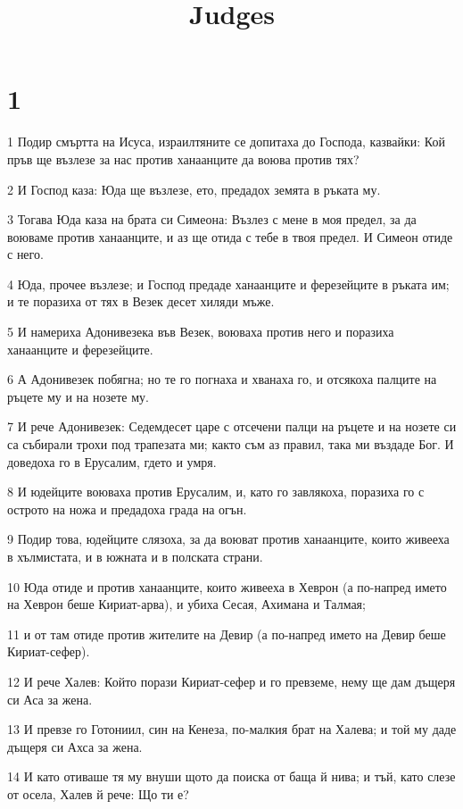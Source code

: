 

\title{Judges}


\chapter{1}

\par 1 Подир смъртта на Исуса, израилтяните се допитаха до Господа, казвайки: Кой пръв ще възлезе за нас против ханаанците да воюва против тях?
\par 2 И Господ каза: Юда ще възлезе, ето, предадох земята в ръката му.
\par 3 Тогава Юда каза на брата си Симеона: Възлез с мене в моя предел, за да воюваме против ханаанците, и аз ще отида с тебе в твоя предел. И Симеон отиде с него.
\par 4 Юда, прочее възлезе; и Господ предаде ханаанците и ферезейците в ръката им; и те поразиха от тях в Везек десет хиляди мъже.
\par 5 И намериха Адонивезека във Везек, воюваха против него и поразиха ханаанците и ферезейците.
\par 6 А Адонивезек побягна; но те го погнаха и хванаха го, и отсякоха палците на ръцете му и на нозете му.
\par 7 И рече Адонивезек: Седемдесет царе с отсечени палци на ръцете и на нозете си са събирали трохи под трапезата ми; както съм аз правил, така ми въздаде Бог. И доведоха го в Ерусалим, гдето и умря.
\par 8 И юдейците воюваха против Ерусалим, и, като го завлякоха, поразиха го с острото на ножа и предадоха града на огън.
\par 9 Подир това, юдейците слязоха, за да воюват против ханаанците, които живееха в хълмистата, и в южната и в полската страни.
\par 10 Юда отиде и против ханаанците, които живееха в Хеврон (а по-напред името на Хеврон беше Кириат-арва), и убиха Сесая, Ахимана и Талмая;
\par 11 и от там отиде против жителите на Девир (а по-напред името на Девир беше Кириат-сефер).
\par 12 И рече Халев: Който порази Кириат-сефер и го превземе, нему ще дам дъщеря си Аса за жена.
\par 13 И превзе го Готониил, син на Кенеза, по-малкия брат на Халева; и той му даде дъщеря си Ахса за жена.
\par 14 И като отиваше тя му внуши щото да поиска от баща й нива; и тъй, като слезе от осела, Халев й рече: Що ти е?
